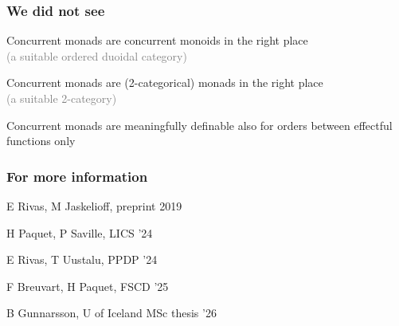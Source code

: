 \documentclass[aspectratio=169,11pt]{beamer}
\newcommand{\gray}[1]{\textcolor{gray}{#1}}
\begin{document}
\begin{frame}

\frametitle{We did not see}

  Concurrent monads are concurrent monoids in the right place \\
  \gray{(a
  suitable ordered duoidal category)}

  Concurrent monads are (2-categorical) monads in the right place \\
  \gray{(a suitable 2-category)}

  Concurrent monads are meaningfully definable also for orders
  between effectful functions only
  
\end{frame}



\begin{frame}

\frametitle{For more information}

  E Rivas, M Jaskelioff, preprint 2019

  H Paquet, P Saville, LICS '24

  E Rivas, T Uustalu, PPDP '24

  F Breuvart, H Paquet, FSCD '25

  B Gunnarsson, U of Iceland MSc thesis '26

\end{frame}  
\end{document}
